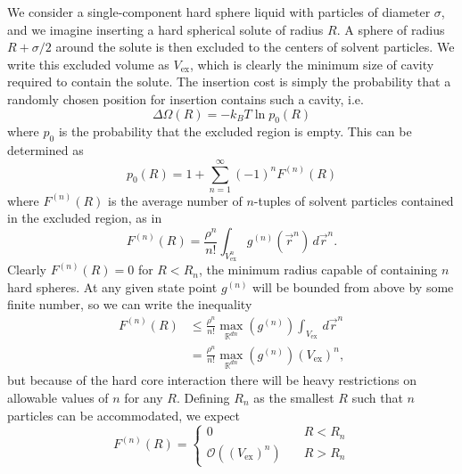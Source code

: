 \documentclass[11pt,twoside]{report}
\begin{document}
We consider a single-component hard sphere liquid with particles of diameter $\sigma$, and we imagine inserting a hard spherical solute of radius $R$.
A sphere of radius $R + \sigma/2$ around the solute is then excluded to the centers of solvent particles.
We write this excluded volume as $V_\mathrm{ex}$, which is clearly the minimum size of cavity required to contain the solute.
The insertion cost is simply the probability that a randomly chosen position for insertion contains such a cavity, i.e.\
\begin{equation}\label{eq:insertion-from-p}
  \Delta \Omega(R)
  =
  -k_B T \ln p_0(R)
\end{equation}
where $p_0$ is the probability that the excluded region is empty.
This can be determined as \cite{ReissJCP1959}
\begin{equation}\label{eq:spt-zero-cavity-p}
  p_0(R) = 1 + \sum_{n=1}^\infty (-1)^n F^{(n)}(R)
\end{equation}
where $F^{(n)}(R)$ is the average number of $n$-tuples of solvent particles contained in the excluded region, as in
\begin{equation}\label{eq:spt-tuple-function}
  F^{(n)}(R)
  =
  \frac{\rho^n}{n!}
  \int_{V_\mathrm{ex}^n} g^{(n)}(\vec{r}^n) \, d\vec{r}^n.
\end{equation}
Clearly $F^{(n)}(R) = 0$ for $R < R_n$, the minimum radius capable of containing $n$ hard spheres.
At any given state point $g^{(n)}$ will be bounded from above by some finite number, so we can write the inequality%
\begin{equation}\label{eq:spt-tuple-function-upper-bound}
  \begin{split}
    F^{(n)}(R) &\le
    \frac{\rho^n}{n!}
    \max_{\mathbb{R}^{dn}}{\left(g^{(n)}\right)}
    \int_{V_\mathrm{ex}} \, d\vec{r}^n \\
    &=
    \frac{\rho^n}{n!}
    \max_{\mathbb{R}^{dn}}{\left(g^{(n)}\right)}
    (V_\mathrm{ex})^n,
  \end{split}
\end{equation}
but because of the hard core interaction there will be heavy restrictions on allowable values of $n$ for any $R$.
Defining $R_n$ as the smallest $R$ such that $n$ particles can be accommodated, we expect
\begin{equation}\label{eq:F-scaling}
  F^{(n)}(R) =
  \begin{cases}
    0 & \quad R < R_n \\
    \mathcal{O}\left( \left(V_\mathrm{ex}\right)^n \right) & \quad R > R_n
  \end{cases}
\end{equation}
\end{document}

